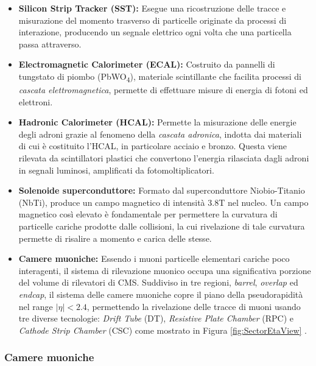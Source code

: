 \begin{itemize}
  \item \textbf{Silicon Strip Tracker (SST):} Esegue una ricostruzione delle tracce e misurazione del momento trasverso di particelle originate da processi di interazione, producendo un segnale elettrico ogni volta che una particella passa attraverso.
  \item \textbf{Electromagnetic Calorimeter (ECAL):} Costruito da pannelli di tungstato di piombo (\si{PbWO_4}), materiale scintillante che facilita processi di \textit{cascata elettromagnetica}, permette di effettuare misure di energia di fotoni ed elettroni.
  \item \textbf{Hadronic Calorimeter (HCAL):} Permette la misurazione delle energie degli adroni grazie al fenomeno della \textit{cascata adronica}, indotta dai materiali di cui è costituito l'HCAL, in particolare acciaio e bronzo. Questa viene rilevata da scintillatori plastici che convertono l'energia rilasciata dagli adroni in segnali luminosi, amplificati da fotomoltiplicatori.
  \item \textbf{Solenoide superconduttore:} Formato dal superconduttore Niobio-Titanio (NbTi), produce un campo magnetico di intensità 3.8T nel nucleo. Un campo magnetico così elevato è fondamentale per permettere la curvatura di particelle cariche prodotte dalle collisioni, la cui rivelazione di tale curvatura permette di risalire a momento e carica delle stesse.
  \item \textbf{Camere muoniche:} Essendo i muoni particelle elementari cariche poco interagenti, il sistema di rilevazione muonico occupa una significativa porzione del volume di rilevatori di CMS. Suddiviso in tre regioni, \textit{barrel}, \textit{overlap} ed \textit{endcap}, il sistema delle camere muoniche copre il piano della pseudorapidità nel range $|\eta| < 2.4$, permettendo la rivelazione delle tracce di muoni usando tre diverse tecnologie: \textit{Drift Tube} (DT), \textit{Resistive Plate Chamber} (RPC) e \textit{Cathode Strip Chamber} (CSC) come mostrato in Figura \ref{fig:SectorEtaView} \cite{TheMuonProject}.
\end{itemize}


\subsubsection{Camere muoniche}

